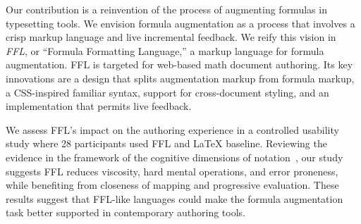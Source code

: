 Our contribution is a reinvention of the process of augmenting formulas in typesetting tools. We envision formula augmentation as a process that involves a crisp markup language and live incremental feedback. We reify this vision in \emph{FFL}, or ``Formula Formatting Language,'' a markup language for formula augmentation. FFL is targeted for web-based math document authoring. Its key innovations are a design that splits augmentation markup from formula markup, a CSS-inspired familiar syntax, support for cross-document styling, and an implementation that permits live feedback.





We assess FFL's impact on the authoring experience in a controlled usability study where 28 participants used FFL and  LaTeX baseline.
Reviewing the evidence in the framework of the cognitive dimensions of notation~\cite{ref:blackwell2003notational}, our study suggests FFL reduces viscosity, hard mental operations, and error proneness, while benefiting from closeness of mapping and progressive evaluation. These results suggest that FFL-like languages could make the formula augmentation task better supported in contemporary authoring tools.

